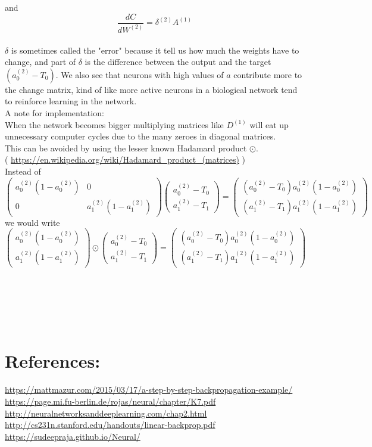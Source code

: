 \documentclass{article}
\begin{document}
and
\[
\frac{dC}{dW^{(2)}} = \delta^{(2)} A^{(1)} 
\]
\\
$\delta$ is sometimes called the "error" because it tell us how much the weights have to change, and part of $\delta$ is the difference between the output and the target $(a_{0}^{(2)}-T_0)$. We also see that neurons with high values of $a$ contribute more to the change matrix, kind of like more active neurons in a biological network tend to reinforce learning in the network.
\\
A note for implementation:
\\
When the network becomes bigger multiplying matrices like $D^{(1)}$ will eat up unnecessary computer cycles due to the many zeroes in diagonal matrices.
\\
This can be avoided by using the lesser known Hadamard product $\odot$. 
\\
( \url{https://en.wikipedia.org/wiki/Hadamard_product_(matrices)} )
\\
Instead of
\[
\begin{pmatrix}
a_{0}^{(2)}(1-a_{0}^{(2)}) & 0 \\
0 & a_{1}^{(2)}(1-a_{1}^{(2)})
\end{pmatrix}
\begin{pmatrix}
a_{0}^{(2)}-T_0 \\ a_{1}^{(2)}-T_1
\end{pmatrix} =
\begin{pmatrix}
(a_0^{(2)}-T_0)a_0^{(2)}(1-a_0^{(2)}) \\ (a_1^{(2)}-T_1)a_1^{(2)}(1-a_1^{(2)})
\end{pmatrix}
\]
we would write
\\
\[
\begin{pmatrix}
a_{0}^{(2)}(1-a_{0}^{(2)}) \\
a_{1}^{(2)}(1-a_{1}^{(2)})
\end{pmatrix}
\odot
\begin{pmatrix}
a_{0}^{(2)}-T_0 \\ a_{1}^{(2)}-T_1
\end{pmatrix} =
\begin{pmatrix}
(a_0^{(2)}-T_0)a_0^{(2)}(1-a_0^{(2)}) \\ (a_1^{(2)}-T_1)a_1^{(2)}(1-a_1^{(2)})
\end{pmatrix}
\]
\\
\\
\\
\\
\\
\section{References:}
\url{https://mattmazur.com/2015/03/17/a-step-by-step-backpropagation-example/}
\\
\url{https://page.mi.fu-berlin.de/rojas/neural/chapter/K7.pdf}
\\
\url{http://neuralnetworksanddeeplearning.com/chap2.html}
\\
\url{http://cs231n.stanford.edu/handouts/linear-backprop.pdf}
\\
\url{https://sudeepraja.github.io/Neural/}
\\
\end{document}
